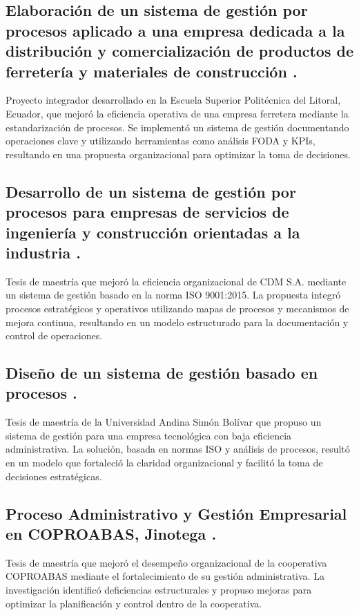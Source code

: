 \subsection{Elaboración de un sistema de gestión por procesos aplicado a una empresa dedicada a la distribución y comercialización de productos de ferretería y materiales de construcción \cite{Vargas2018}.}

Proyecto integrador desarrollado en la Escuela Superior Politécnica del Litoral, Ecuador, que mejoró la eficiencia operativa de una empresa ferretera mediante la estandarización de procesos. Se implementó un sistema de gestión documentando operaciones clave y utilizando herramientas como análisis FODA y KPIs, resultando en una propuesta organizacional para optimizar la toma de decisiones.

\subsection{Desarrollo de un sistema de gestión por procesos para empresas de servicios de ingeniería y construcción orientadas a la industria \cite{Munoz2018}.}

Tesis de maestría que mejoró la eficiencia organizacional de CDM S.A. mediante un sistema de gestión basado en la norma ISO 9001:2015. La propuesta integró procesos estratégicos y operativos utilizando mapas de procesos y mecanismos de mejora continua, resultando en un modelo estructurado para la documentación y control de operaciones.

\subsection{Diseño de un sistema de gestión basado en procesos \cite{Jacome2016}.}

Tesis de maestría de la Universidad Andina Simón Bolívar que propuso un sistema de gestión para una empresa tecnológica con baja eficiencia administrativa. La solución, basada en normas ISO y análisis de procesos, resultó en un modelo que fortaleció la claridad organizacional y facilitó la toma de decisiones estratégicas.

\subsection{Proceso Administrativo y Gestión Empresarial en COPROABAS, Jinotega \cite{Flores15}.}

Tesis de maestría que mejoró el desempeño organizacional de la cooperativa COPROABAS mediante el fortalecimiento de su gestión administrativa. La investigación identificó deficiencias estructurales y propuso mejoras para optimizar la planificación y control dentro de la cooperativa.

